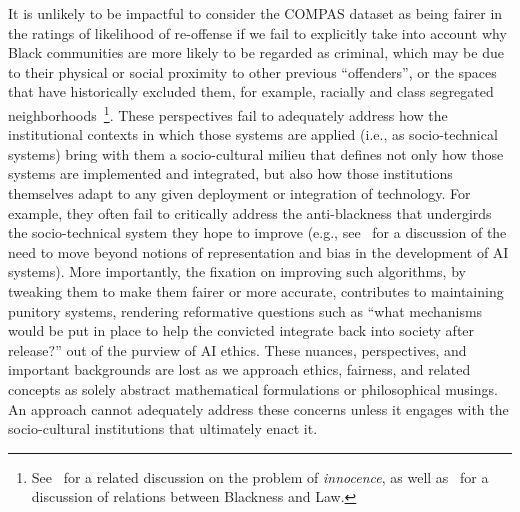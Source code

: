 \documentclass[manuscript]{acmart}
\begin{document}
It is unlikely to be impactful to consider the COMPAS dataset as being fairer in the ratings of likelihood of re-offense if we fail to explicitly take into account why Black communities are more likely to be regarded as criminal, which may be due to their physical or social proximity to other previous ``offenders'', or the spaces that have historically excluded them, for example, racially and class segregated neighborhoods~\footnote{See~\cite{gilmore2017abolition} for a related discussion on the problem of \textit{innocence}, as well as~\cite{weheliye2014habeas} for a discussion of relations between Blackness and Law.}. These perspectives fail to adequately address how the institutional contexts in which those systems are applied (i.e., as socio-technical systems) bring with them a socio-cultural milieu that defines not only how those systems are implemented and integrated, but also how those institutions themselves adapt to any given deployment or integration of technology. For example, they often fail to critically address the anti-blackness that undergirds the socio-technical system they hope to improve (e.g., see~\cite{dancy21blackness} for a discussion of the need to move beyond notions of representation and bias in the development of AI systems). More importantly, the fixation on improving such algorithms, by tweaking them to make them fairer or more accurate, contributes to maintaining punitory systems, rendering reformative questions such as ``what mechanisms would be put in place to help the convicted integrate back into society after release?'' out of the purview of AI ethics. These nuances, perspectives, and important backgrounds are lost as we approach ethics, fairness, and related concepts as solely abstract mathematical formulations or philosophical musings. An approach cannot adequately address these concerns unless it engages with the socio-cultural institutions that %
ultimately enact it.
\end{document}
